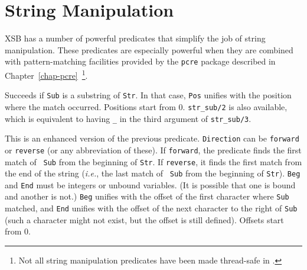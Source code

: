 
\section{String Manipulation}
\label{sec-strings}

XSB has a number of powerful predicates that simplify the job of
string manipulation. These predicates are especially powerful when
they are combined with pattern-matching facilities provided by the
{\tt pcre} package described in
Chapter~\ref{chap-pcre}~\footnote{Not all string
  manipulation predicates have been made thread-safe in \version{}.}.

\begin{description}

Succeeds if {\tt Sub} is a substring of {\tt Str}. In that case, {\tt Pos}
unifies with the position where the match occurred. Positions start
from 0. {\tt str\_sub/2} is also available, which is equivalent
to having {\tt \_} in the third argument of {\tt str\_sub/3}.


This is an enhanced version of the previous predicate.
{\tt Direction} can be {\tt forward} or {\tt reverse} (or any abbreviation
of these). If {\tt forward}, the predicate finds the first match of {\tt
  Sub} from the beginning of {\tt Str}. If {\tt reverse}, it finds the
first match from the end of the string ({\it i.e.}, the last match of {\tt
  Sub} from the beginning of {\tt Str}). {\tt Beg} and {\tt End} must be
integers or unbound variables. (It is possible that one is bound and
another is not.)
{\tt Beg} unifies with the offset of the first character where {\tt Sub}
matched, and {\tt End} unifies with the offset of the next character to the
right of {\tt Sub} (such a character might not exist, but the offset is
still defined). Offsets start from 0.


\end{description}

